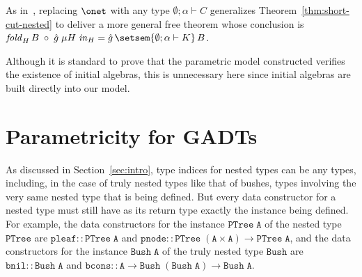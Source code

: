 \documentclass{lmcs}
\theoremstyle{plain}\newtheorem{satz}[thm]{Satz}
\begin{document}
\vspace*{0.05in}

As in~\cite{jg10}, replacing $\onet$ with any type $\emptyset;\alpha
\vdash C$ generalizes Theorem~\ref{thm:short-cut-nested} to deliver a
more general free theorem whose conclusion is $\mathit{fold}_{H}\, B
\; \circ \; \hat{g}\; \mu H \; \mathit{in}_{H} = \hat{g}
\,\setsem{\emptyset;\alpha \vdash K}\, B$.

\vspace*{0.05in}

Although it is standard to prove that the parametric model constructed
verifies the existence of initial algebras, this is unnecessary here
since initial algebras are built directly into our model.

\section{Parametricity for GADTs}\label{sec:GADTs}

As discussed in Section~\ref{sec:intro}, type indices for nested types
can be any types, including, in the case of truly nested types like
that of bushes, types involving the very same nested type that is
being defined. But every data constructor for a nested type must still
have as its return type exactly the instance being defined. For
example, the data constructors for the instance $\mathtt{PTree\; A}$ of the
nested type $\mathtt{PTree}$ are $\mathtt{pleaf :: PTree\; A}$ and
$\mathtt{pnode :: PTree\; (A \times A) \to PTree\; A}$, and
the data constructors for the instance $\mathtt{Bush \;A}$ of the truly
nested type $\mathtt{Bush}$ are $\mathtt{bnil :: Bush\; A}$ and
$\mathtt{bcons :: A \to Bush\; (Bush\; A) \to Bush\; A}$.
\end{document}
